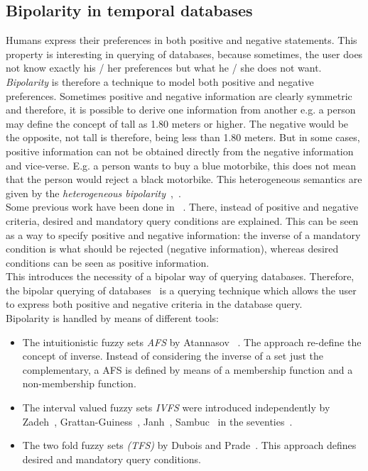 \subsection{Bipolarity in temporal databases}
\label{subsubsec:bipolarity}
Humans express their preferences in both positive and negative statements. This property is interesting in querying of databases, because sometimes, the user does not know exactly his / her preferences but what he / she does not want. \emph{Bipolarity} is therefore a technique to model both positive and negative preferences. Sometimes positive and negative information are clearly symmetric and therefore, it is possible to derive one information from another e.g. a person may define the concept of tall as 1.80 meters or higher. The negative would be the opposite, not tall is therefore, being less than 1.80 meters.  But in some cases, positive information can not be obtained directly from the negative information and vice-verse. E.g. a person wants to buy a blue motorbike, this does not mean that the person would reject a black motorbike. This heterogeneous semantics are given by the \emph{heterogeneous bipolarity}~\cite{Dubois2006},~\cite{Dubois2008}.\\

Some previous work have been done in ~\cite{Lacroix87}. There, instead of positive and negative criteria, desired and mandatory query conditions are explained. This can be seen as a way to specify positive and negative information: the inverse of a mandatory condition is what should be rejected (negative information), whereas desired conditions can be seen as positive information.\\


This introduces the necessity of a bipolar way of querying databases. Therefore, the bipolar querying of databases~\cite{DeTre2009} is a querying technique which allows the user to express both positive and negative criteria in the database query.\\

Bipolarity is handled by means of different tools:

\begin{itemize}
\item
The intuitionistic fuzzy sets  \emph{AFS} by Atannasov ~\cite{Atanassov1986}. The approach re-define the concept of inverse. Instead of considering the inverse of a set just the complementary, a AFS is defined by means of a membership function and a non-membership function.
\item
The interval valued fuzzy sets \emph{IVFS} were introduced independently by Zadeh~\cite{Zadeh75a}, Grattan-Guiness~\cite{Grattan76}, Janh~\cite{Jahn75}, Sambuc~\cite{Sambuc75} in the seventies~\cite{Dubois05}. %
\item
The two fold fuzzy sets \emph{(TFS)} by Dubois and Prade~\cite{Dubois02}. This approach defines desired and mandatory query conditions.
\end{itemize}

